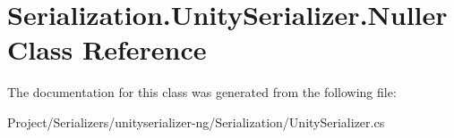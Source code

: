 \hypertarget{class_serialization_1_1_unity_serializer_1_1_nuller}{}\section{Serialization.\+Unity\+Serializer.\+Nuller Class Reference}
\label{class_serialization_1_1_unity_serializer_1_1_nuller}


The documentation for this class was generated from the following file\+:\begin{DoxyCompactItemize}
\item 
Project/\+Serializers/unityserializer-\/ng/\+Serialization/Unity\+Serializer.\+cs\end{DoxyCompactItemize}
